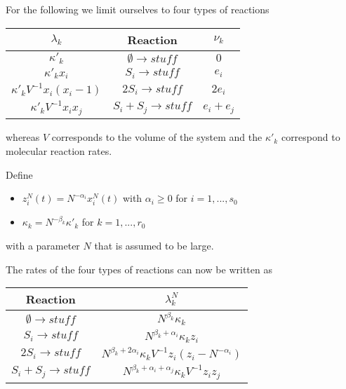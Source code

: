 \documentclass[english]{article}
\begin{document}
For the following we limit ourselves to four types of reactions

\medskip{}


\begin{tabular}{|c|c|c|}
    \hline
    $\lambda_{k}$ & Reaction & $\nu_{k}$ \\
    \hline
    \hline
    $\kappa'_{k}$ & $\emptyset \rightarrow stuff$ & $0$ \\
    \hline
    $\kappa'_{k}x_{i}$ & $S_{i} \rightarrow stuff$ & $e_{i}$ \\
    \hline
    $\kappa'_{k}V^{-1}x_{i}(x_{i}-1)$ & $2S_{i}\rightarrow stuff$
        & $2e_{i}$ \\
    \hline
    $\kappa'_{k}V^{-1}x_{i}x_{j}$ & $S_{i}+S_{j}\rightarrow stuff$
        & $e_{i}+e_{j}$ \\
    \hline
\end{tabular}

\bigskip{}


whereas $V$ corresponds to the volume of the system and the
$\kappa'_{k}$ correspond to molecular reaction rates.

Define
\begin{itemize}
    \item $z_{i}^{N}(t) = N^{-\alpha_{i}} x_{i}^{N}(t)$ with
        $\alpha_{i} \geq 0$ for $i = 1, ..., s_{0}$
    \item $\kappa_{k} = N^{-\beta_{k}} \kappa'_{k}$ for
        $k = 1, ..., r_{0}$
\end{itemize}
with a parameter $N$ that is assumed to be large.

The rates of the four types of reactions can now be written as

\medskip{}


\begin{tabular}{|c|c|}
    \hline
    Reaction & $\lambda_{k}^{N}$ \\
    \hline
    \hline
    $\emptyset \rightarrow stuff$ & $N^{\beta_{k}} \kappa_{k}$ \\
    \hline
    $S_{i}\rightarrow stuff$ &
        $N^{\beta_{k} + \alpha_{i}} \kappa_{k} z_{i}$ \\
    \hline
    $2S_{i} \rightarrow stuff$
        & $N^{\beta_{k} + 2\alpha_{i}} \kappa_{k} V^{-1} z_{i} \left(
            z_{i} - N^{-\alpha_{i}}
        \right)$ \\
    \hline
    $S_{i} + S_{j} \rightarrow stuff$
        & $N^{\beta_{k} + \alpha_{i} + \alpha_{j}} \kappa_{k} V^{-1}
            z_{i} z_{j}$ \\
    \hline
\end{tabular}
\end{document}
